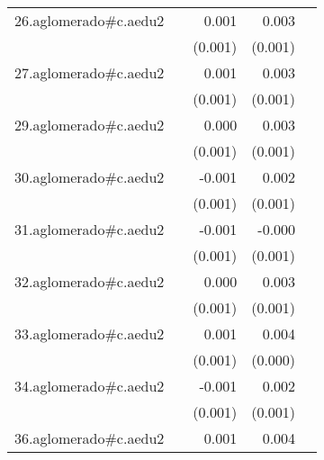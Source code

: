 {\begin{longtable}{l*{4}{D{.}{.}{-1}}}
\addlinespace
26.aglomerado#c.aedu2&                     &       0.001         &       0.003\sym{***}&                     \\
            &                     &     (0.001)         &     (0.001)         &                     \\
\addlinespace
27.aglomerado#c.aedu2&                     &       0.001         &       0.003\sym{***}&                     \\
            &                     &     (0.001)         &     (0.001)         &                     \\
\addlinespace
29.aglomerado#c.aedu2&                     &       0.000         &       0.003\sym{***}&                     \\
            &                     &     (0.001)         &     (0.001)         &                     \\
\addlinespace
30.aglomerado#c.aedu2&                     &      -0.001         &       0.002         &                     \\
            &                     &     (0.001)         &     (0.001)         &                     \\
\addlinespace
31.aglomerado#c.aedu2&                     &      -0.001         &      -0.000         &                     \\
            &                     &     (0.001)         &     (0.001)         &                     \\
\addlinespace
32.aglomerado#c.aedu2&                     &       0.000         &       0.003\sym{***}&                     \\
            &                     &     (0.001)         &     (0.001)         &                     \\
\addlinespace
33.aglomerado#c.aedu2&                     &       0.001         &       0.004\sym{***}&                     \\
            &                     &     (0.001)         &     (0.000)         &                     \\
\addlinespace
34.aglomerado#c.aedu2&                     &      -0.001         &       0.002         &                     \\
            &                     &     (0.001)         &     (0.001)         &                     \\
\addlinespace
36.aglomerado#c.aedu2&                     &       0.001         &       0.004\sym{***}&                     \\

\end{longtable}}
